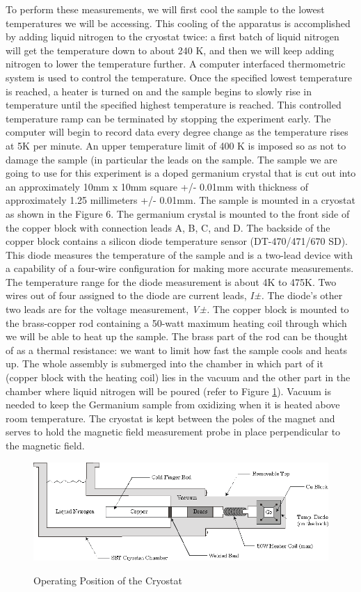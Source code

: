 \documentclass{../lab}
\begin{document}
To perform these measurements, we will first cool the sample to the lowest temperatures we will be accessing. This cooling of the apparatus is accomplished by adding liquid nitrogen to the cryostat twice: a first batch of liquid nitrogen will get the temperature down to about 240 K, and then we will keep adding nitrogen to lower the temperature further. A computer interfaced thermometric system is used to control the temperature. Once the specified lowest temperature is reached, a heater is turned on and the sample begins to slowly rise in temperature until the specified highest temperature is reached. This controlled temperature ramp can be terminated by stopping the experiment early. The computer will begin to record data every degree change as the temperature rises at 5K per minute. An upper temperature limit of 400 K is imposed so as not to damage the sample (in particular the leads on the sample. The sample we are going to use for this experiment is a doped germanium crystal that is cut out into an approximately 10mm x 10mm square +/- 0.01mm with thickness of approximately 1.25 millimeters +/- 0.01mm. The sample is mounted in a cryostat as shown in the Figure 6. The germanium crystal is mounted to the front side of the copper block with connection leads A, B, C, and D. The backside of the copper block contains a silicon diode temperature sensor (DT-470/471/670 SD). This diode measures the temperature of the sample and is a two-lead device with a capability of a four-wire configuration for making more accurate measurements. The temperature range for the diode measurement is about 4K to 475K. Two wires out of four assigned to the diode are current leads, \emph{I±.} The diode's other two leads are for the voltage measurement, \emph{V±.} The copper block is mounted to the brass-copper rod containing a 50-watt maximum heating coil through which we will be able to heat up the sample. The brass part of the rod can be thought of as a thermal resistance: we want to limit how fast the sample cools and heats up. The whole assembly is submerged into the chamber in which part of it (copper block with the heating coil) lies in the vacuum and the other part in the chamber where liquid nitrogen will be poured (refer to Figure \ref{fig:OperatingPositionOfCryostat}). Vacuum is needed to keep the Germanium sample from oxidizing when it is heated above room temperature. The cryostat is kept between the poles of the magnet and serves to hold the magnetic field measurement probe in place perpendicular to the magnetic field.

\begin{figure}[h]
    \centering
    \href{http://experimentationlab.berkeley.edu/sites/default/files/images/SHEimage100.gif}{\includegraphics[width=0.7\linewidth]{images/SHEimage100.png}}
    \caption{Operating Position of the Cryostat}
    \label{fig:OperatingPositionOfCryostat}
\end{figure}
\end{document}
